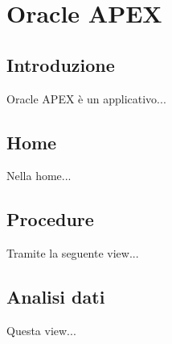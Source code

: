 \section{Oracle APEX}

\subsection{Introduzione}
Oracle APEX è un applicativo...

\subsection{Home}
Nella home...

\subsection{Procedure}
Tramite la seguente view...

\subsection{Analisi dati}
Questa view...
